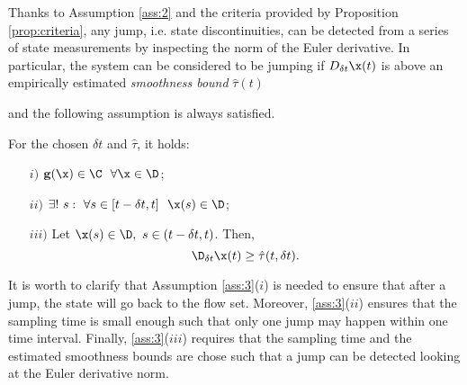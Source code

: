 Thanks to Assumption \ref{ass:2} and the criteria provided by Proposition \ref{prop:criteria}, any jump, i.e. state discontinuities, can be detected from a series of state measurements by inspecting the norm of the Euler derivative. In particular, the system can be considered to be jumping if $D_{\delta t}\x(t)$ is above an empirically estimated \textit{smoothness bound} $\hat{\tau}(t)$
%
{%
and the following assumption is always satisfied.%
\begin{assum}\label{ass:3}
    For the chosen $\delta t$ and $\hat{\tau}$, it holds:
    \begin{itemize}
        \item[$i)$] $\mathbf{g}(\x)\in\C~~\forall\x\in\D$;
        \item[$ii)$] $\exists ! ~s:~\forall s\in[t-\delta t,t]~~\x(s)\in\D$;
        \item[$iii)$] Let $\x(s)\in\D,~s\in(t-\delta t,t)$. Then,    
        \begin{equation}\label{eq:ass3.3}
            \D_{\delta t} \x(t)\geq \hat{\tau}(t,\delta t).
        \end{equation}
    \end{itemize}
\end{assum}
}
%
It is worth to clarify that Assumption \ref{ass:3}($i$) is needed to ensure that after a jump, the state will go back to the flow set. Moreover,  \ref{ass:3}($ii$) ensures that the sampling time is small enough such that only one jump may happen within one time interval. Finally, \ref{ass:3}($iii$) requires that the sampling time and the estimated smoothness bounds are chose such that a jump can be detected looking at the Euler derivative norm.

